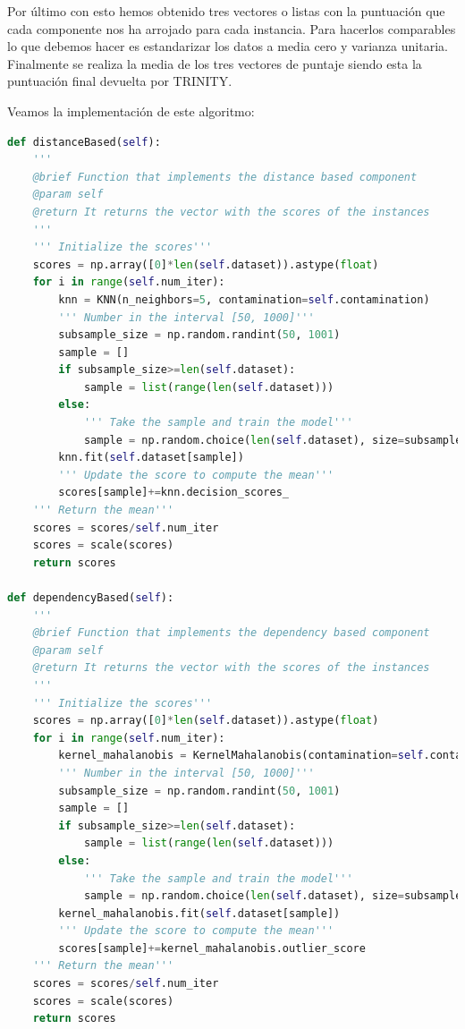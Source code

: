Por último con esto hemos obtenido tres vectores o listas con la puntuación que cada componente nos ha arrojado para cada instancia. Para hacerlos comparables lo que debemos hacer es estandarizar los datos a media cero y varianza unitaria. Finalmente se realiza la media de los tres vectores de puntaje siendo esta la puntuación final devuelta por TRINITY.

Veamos la implementación de este algoritmo:

\begin{lstlisting}[language=Python]
def distanceBased(self):
	'''
	@brief Function that implements the distance based component
	@param self
	@return It returns the vector with the scores of the instances
	'''
	''' Initialize the scores'''
	scores = np.array([0]*len(self.dataset)).astype(float)
	for i in range(self.num_iter):
		knn = KNN(n_neighbors=5, contamination=self.contamination)
		''' Number in the interval [50, 1000]'''
		subsample_size = np.random.randint(50, 1001)
		sample = []
		if subsample_size>=len(self.dataset):
			sample = list(range(len(self.dataset)))
		else:
			''' Take the sample and train the model'''
			sample = np.random.choice(len(self.dataset), size=subsample_size, replace=False)
		knn.fit(self.dataset[sample])
		''' Update the score to compute the mean'''
		scores[sample]+=knn.decision_scores_
	''' Return the mean'''
	scores = scores/self.num_iter
	scores = scale(scores)
	return scores

def dependencyBased(self):
	'''
	@brief Function that implements the dependency based component
	@param self
	@return It returns the vector with the scores of the instances
	'''
	''' Initialize the scores'''
	scores = np.array([0]*len(self.dataset)).astype(float)
	for i in range(self.num_iter):
		kernel_mahalanobis = KernelMahalanobis(contamination=self.contamination)
		''' Number in the interval [50, 1000]'''
		subsample_size = np.random.randint(50, 1001)
		sample = []
		if subsample_size>=len(self.dataset):
			sample = list(range(len(self.dataset)))
		else:
			''' Take the sample and train the model'''
			sample = np.random.choice(len(self.dataset), size=subsample_size, replace=False)
		kernel_mahalanobis.fit(self.dataset[sample])
		''' Update the score to compute the mean'''
		scores[sample]+=kernel_mahalanobis.outlier_score
	''' Return the mean'''
	scores = scores/self.num_iter
	scores = scale(scores)
	return scores


\end{lstlisting}
